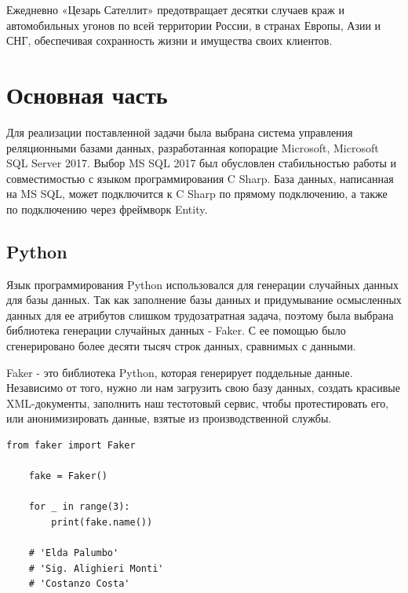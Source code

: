 \vspace{0.1cm}
Ежедневно «Цезарь Сателлит» предотвращает десятки случаев краж и автомобильных угонов по всей территории России, в странах Европы, Азии и СНГ, обеспечивая сохранность жизни и имущества своих клиентов\cite{csat}.


\newpage
\section{Основная часть}

\vspace{0.5cm}
\hspace{0.6cm}
Для реализации поставленной задачи была выбрана система управления реляционными базами данных, разработанная копорацие Microsoft, Microsoft SQL Server 2017. Выбор MS SQL 2017 был обусловлен стабильностью работы и совместимостью с языком программирования C Sharp. База данных, написанная на MS SQL, может подключится к C Sharp по прямому подключению, а также по подключению через   фреймворк Entity.



\subsection{Python}

\vspace{0.5cm}
\hspace{0.6cm}
Язык программирования Python использовался для генерации случайных данных для базы данных. Так как заполнение базы данных и придумывание осмысленных данных для ее атрибутов слишком трудозатратная задача, поэтому была выбрана библиотека генерации случайных данных - Faker. С ее помощью было сгенерировано более десяти тысяч строк данных, сравнимых с данными.

\vspace{0.1cm}
Faker - это библиотека Python, которая генерирует поддельные данные. Независимо от того, нужно ли нам загрузить свою базу данных, создать красивые XML-документы, заполнить наш тестотовый сервис, чтобы протестировать его, или анонимизировать данные, взятые из производственной службы.

\begin{lstlisting}[caption=Создание фейковых имен, label = list:pythonFakerName]
	from faker import Faker
	
	fake = Faker()
	
	for _ in range(3):
		print(fake.name())
	
	# 'Elda Palumbo'
	# 'Sig. Alighieri Monti'
	# 'Costanzo Costa'

\end{lstlisting}

